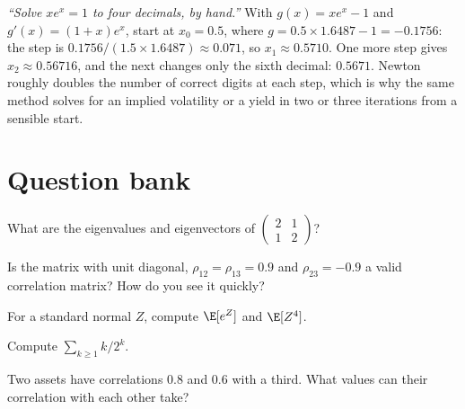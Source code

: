 \begin{example}\label{ex:iv:linear-algebra-and-calculus:newton}
\emph{``Solve $xe^x = 1$ to four decimals, by hand.''} With $g(x) = xe^x - 1$ and $g'(x) = (1 + x)e^x$, start at $x_0 =
0.5$, where $g = 0.5 \times 1.6487 - 1 = -0.1756$: the step is $0.1756/(1.5 \times 1.6487) \approx 0.071$, so $x_1
\approx 0.5710$. One more step gives $x_2 \approx 0.56716$, and the next changes only the sixth decimal: $0.5671$. Newton
roughly doubles the number of correct digits at each step, which is why the same method solves for an implied volatility
or a yield in two or three iterations from a sensible start.
\end{example}

\section{Question bank}

\begin{interviewq}\label{iq:iv:linear-algebra-and-calculus:1}
What are the eigenvalues and eigenvectors of $\begin{pmatrix} 2 & 1 \\ 1 & 2 \end{pmatrix}$?
\end{interviewq}

\begin{interviewq}\label{iq:iv:linear-algebra-and-calculus:2}
Is the matrix with unit diagonal, $\rho_{12} = \rho_{13} = 0.9$ and $\rho_{23} = -0.9$ a valid correlation matrix? How do
you see it quickly?
\end{interviewq}

\begin{interviewq}\label{iq:iv:linear-algebra-and-calculus:3}
For a standard normal $Z$, compute $\E[e^Z]$ and $\E[Z^4]$.
\end{interviewq}

\begin{interviewq}\label{iq:iv:linear-algebra-and-calculus:4}
Compute $\sum_{k \ge 1} k/2^k$.
\end{interviewq}

\begin{interviewq}\label{iq:iv:linear-algebra-and-calculus:5}
Two assets have correlations 0.8 and 0.6 with a third. What values can their correlation with each other take?
\end{interviewq}

